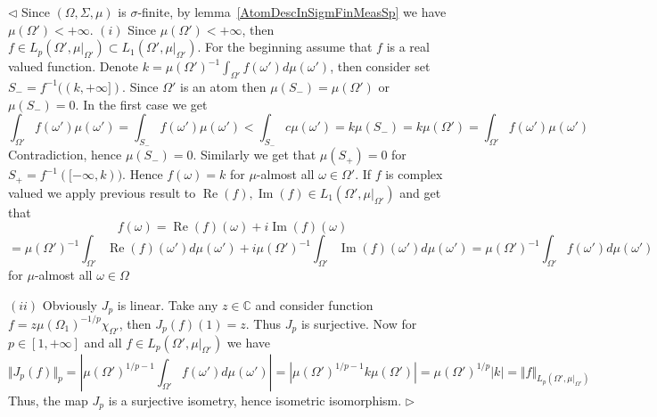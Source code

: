 \documentclass[12pt]{article}
\newenvironment{proof}{\par $\triangleleft$}{$\triangleright$}
\begin{document}
\begin{proof}
    Since $(\Omega,\Sigma,\mu)$ is $\sigma$-finite, by
    lemma~\ref{AtomDescInSigmFinMeasSp} we have $\mu(\Omega')<+\infty$.
    $(i)$ Since $\mu(\Omega')<+\infty$, then $f\in
        L_p(\Omega',\mu|_{\Omega'})\subset L_1(\Omega',\mu|_{\Omega'})$. For the
    beginning assume that $f$ is a real valued function. Denote
    $k={\mu(\Omega')}^{-1}\int_{\Omega'} f(\omega')d\mu(\omega')$, then consider
    set $S_-=f^{-1}((k,+\infty])$. Since $\Omega'$ is an atom then  %
    $\mu(S_-)=\mu(\Omega')$ or $\mu(S_-)=0$. In the first case we get
    $$
        \int_{\Omega'} f(\omega')\mu(\omega')
        =\int_{S_-} f(\omega')\mu(\omega')
        <\int_{S_-} c\mu(\omega')
        =k\mu(S_-)
        =k\mu(\Omega')
        =\int_{\Omega'} f(\omega')\mu(\omega')
    $$
    Contradiction, hence $\mu(S_-)=0$. Similarly we get that $\mu(S_+)=0$ for
    $S_+=f^{-1}([-\infty,k))$. Hence $f(\omega)=k$ for $\mu$-almost  %
    all $\omega\in\Omega'$. If $f$ is complex valued we apply previous result to
    $\operatorname{Re}(f),\operatorname{Im}(f)\in L_1(\Omega',\mu|_{\Omega'})$
    and get that
    $$
        f(\omega)
        =\operatorname{Re}(f)(\omega)+i\operatorname{Im}(f)(\omega)
    $$
    $$
        ={\mu(\Omega')}^{-1}\int_{\Omega'}
        \operatorname{Re}(f)(\omega')d\mu(\omega')
        +i{\mu(\Omega')}^{-1}\int_{\Omega'}
        \operatorname{Im}(f)(\omega')d\mu(\omega')
        ={\mu(\Omega')}^{-1}\int_{\Omega'} f(\omega')d\mu(\omega')
    $$
    for $\mu$-almost all $\omega\in\Omega$

    $(ii)$ Obviously $J_p$ is linear. Take any $z\in\mathbb{C}$ and consider
    function $f=z{\mu(\Omega_1)}^{-1/p}\chi_{\Omega'}$, then $J_p(f)(1)=z$. Thus
    $J_p$ is surjective. Now for $p\in[1,+\infty]$ and all $f\in
        L_p(\Omega',\mu|_{\Omega'})$ we have
    $$
        \Vert J_p(f)\Vert_p
        =\left|{\mu(\Omega')}^{1/p-1}\int_{\Omega'}f(\omega')d\mu(\omega')\right|
        =\left|{\mu(\Omega')}^{1/p-1}k\mu(\Omega')\right|
        ={\mu(\Omega')}^{1/p}|k|
        =\Vert f\Vert_{L_p(\Omega',\mu|_{\Omega'})}
    $$
    Thus, the map $J_p$ is a surjective isometry, hence isometric isomorphism.
\end{proof}
\end{document}
